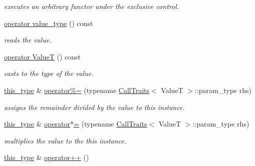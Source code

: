 \begin{DoxyCompactItemize}
\begin{DoxyCompactList}\small\item\em executes an arbitrary functor under the exclusive control. \end{DoxyCompactList}\item 
\hyperlink{classhryky_1_1exclusion_1_1_atomic_a86b7e74f617451e268f58ca8e153c672}{operator value\-\_\-type} () const 
\begin{DoxyCompactList}\small\item\em reads the value. \end{DoxyCompactList}\item 
\hyperlink{group__exclusion__control_ga3893c9d48406bce7b4b07cc0e4b7d20b}{operator Value\-T} () const 
\begin{DoxyCompactList}\small\item\em casts to the type of the value. \end{DoxyCompactList}\item 
\hypertarget{classhryky_1_1exclusion_1_1_atomic_a354df441e4246a412891e3cd52e47ef8}{\hyperlink{classhryky_1_1exclusion_1_1_atomic_writing_afc6301af19df5cf042e0cbed6d273b2a}{this\-\_\-type} \& \hyperlink{classhryky_1_1exclusion_1_1_atomic_a354df441e4246a412891e3cd52e47ef8}{operator\%=} (typename \hyperlink{classhryky_1_1_call_traits}{Call\-Traits}$<$ Value\-T $>$\-::param\-\_\-type rhs)}\label{classhryky_1_1exclusion_1_1_atomic_a354df441e4246a412891e3cd52e47ef8}

\begin{DoxyCompactList}\small\item\em assigns the remainder divided by the value to this instance. \end{DoxyCompactList}\item 
\hypertarget{classhryky_1_1exclusion_1_1_atomic_a7d22cfe9d6a79ac37ba1aee863cc43f6}{\hyperlink{classhryky_1_1exclusion_1_1_atomic_writing_afc6301af19df5cf042e0cbed6d273b2a}{this\-\_\-type} \& \hyperlink{classhryky_1_1exclusion_1_1_atomic_a7d22cfe9d6a79ac37ba1aee863cc43f6}{operator$\ast$=} (typename \hyperlink{classhryky_1_1_call_traits}{Call\-Traits}$<$ Value\-T $>$\-::param\-\_\-type rhs)}\label{classhryky_1_1exclusion_1_1_atomic_a7d22cfe9d6a79ac37ba1aee863cc43f6}

\begin{DoxyCompactList}\small\item\em multiplies the value to the this instance. \end{DoxyCompactList}\item 
\hypertarget{classhryky_1_1exclusion_1_1_atomic_a37830d7c98f4494a1274127a427b84db}{\hyperlink{classhryky_1_1exclusion_1_1_atomic_writing_afc6301af19df5cf042e0cbed6d273b2a}{this\-\_\-type} \& \hyperlink{classhryky_1_1exclusion_1_1_atomic_a37830d7c98f4494a1274127a427b84db}{operator++} ()}\label{classhryky_1_1exclusion_1_1_atomic_a37830d7c98f4494a1274127a427b84db}


\end{DoxyCompactItemize}
